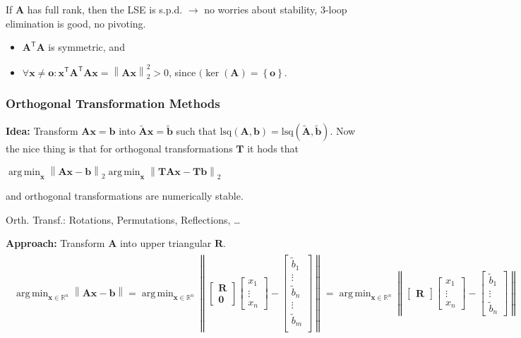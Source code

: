 \documentclass[a4paper,11pt]{extarticle}
\newcommand{\R}{\mathbb{R}}
\newcommand{\set}[1]{\left\{ #1 \right\}}
\newcommand{\norm}[1]{\left\lVert #1 \right\rVert}
\newcommand*{\T}{\mathsf{T}}
\DeclareMathOperator*{\argmin}{arg\,min}
\newcommand{\mat}[1]{\mathbf{#1}}
\renewcommand{\vec}[1]{\mathbf{#1}}
\newcommand{\vb}{\vec{b}}
\newcommand{\vo}{\vec{o}}
\newcommand{\vx}{\vec{x}}
\newcommand{\vtb}{\widetilde{\vec{b}}}
\newcommand{\MA}{\mat{A}}
\newcommand{\MO}{\mat{0}}
\newcommand{\MR}{\mat{R}}
\newcommand{\MT}{\mat{T}}
\newcommand{\MtA}{\widetilde{\mat{A}}}
\begin{document}
\begin{multicols*}{2}
If $\MA$ has full rank, then the LSE is s.p.d. $\to$ no worries about
stability, 3-loop elimination is good, no pivoting.
\begin{itemize}
  \item $\MA^\T\MA$ is symmetric, and
  \item $\forall\vx\neq\vo\colon\vx^\T\MA^\T\MA\vx=\norm{\MA\vx}_2^2>0$, since
  $(\ker(\MA)=\set{\vo}$.
\end{itemize}

\subsubsection{Orthogonal Transformation Methods}

\textbf{Idea:} Transform $\MA\vx=\vb$ into $\MtA\vx=\vtb$ such that
$\text{lsq}(\MA,\vb)=\text{lsq}(\MtA,\vtb)$. Now the nice thing is that for
orthogonal transformations $\MT$ it hods that

$\argmin_\vx\norm{\MA\vx-\vb}_2
\argmin_\vx\norm{\MT\MA\vx-\MT\vb}_2
$

and orthogonal transformations are numerically stable.

Orth. Transf.: Rotations, Permutations, Reflections, \ldots

\textbf{Approach:} Transform $\MA$ into upper triangular $\MR$.
\begin{gather*}
\begin{align*}
\argmin_{\vx\in\R^n}
\norm{\MA\vx-\vb}
=
\argmin_{\vx\in\R^n}
\norm{\begin{bmatrix}
\MR\\
\MO
\end{bmatrix}
\begin{bmatrix}
x_1\\
\vdots\\
x_n
\end{bmatrix}
-
\begin{bmatrix}
\widetilde{b}_1\\
\vdots\\
\widetilde{b}_n\\
\vdots\\
\widetilde{b}_m\\
\end{bmatrix}
}
=
\argmin_{\vx\in\R^n}
\norm{\begin{bmatrix}
\MR
\end{bmatrix}
\begin{bmatrix}
x_1\\
\vdots\\
x_n
\end{bmatrix}
-
\begin{bmatrix}
\widetilde{b}_1\\
\vdots\\
\widetilde{b}_n
\end{bmatrix}
}
\end{align*}
\end{gather*}


\end{multicols*}
\end{document}
